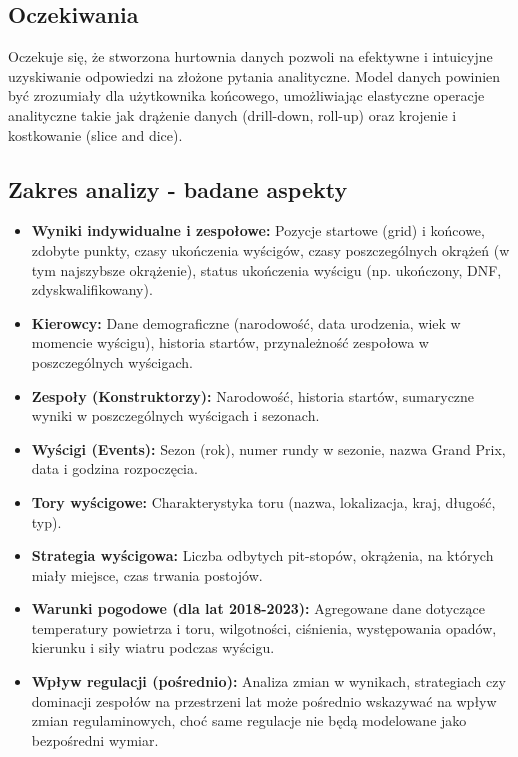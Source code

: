 \documentclass[a4paper,12pt]{article}
\begin{document}
\subsection{Oczekiwania}
Oczekuje się, że stworzona hurtownia danych pozwoli na efektywne i intuicyjne uzyskiwanie odpowiedzi na złożone pytania analityczne. Model danych powinien być zrozumiały dla użytkownika końcowego, umożliwiając elastyczne operacje analityczne takie jak drążenie danych (drill-down, roll-up) oraz krojenie i kostkowanie (slice and dice).

\subsection{Zakres analizy - badane aspekty}
\begin{itemize}[label=\textbullet, leftmargin=*]
  \item \textbf{Wyniki indywidualne i zespołowe:} Pozycje startowe (grid) i końcowe, zdobyte punkty, czasy ukończenia wyścigów, czasy poszczególnych okrążeń (w tym najszybsze okrążenie), status ukończenia wyścigu (np. ukończony, DNF, zdyskwalifikowany).
  \item \textbf{Kierowcy:} Dane demograficzne (narodowość, data urodzenia, wiek w momencie wyścigu), historia startów, przynależność zespołowa w poszczególnych wyścigach.
  \item \textbf{Zespoły (Konstruktorzy):} Narodowość, historia startów, sumaryczne wyniki w poszczególnych wyścigach i sezonach.
  \item \textbf{Wyścigi (Events):} Sezon (rok), numer rundy w sezonie, nazwa Grand Prix, data i godzina rozpoczęcia.
  \item \textbf{Tory wyścigowe:} Charakterystyka toru (nazwa, lokalizacja, kraj, długość, typ).
  \item \textbf{Strategia wyścigowa:} Liczba odbytych pit-stopów, okrążenia, na których miały miejsce, czas trwania postojów.
  \item \textbf{Warunki pogodowe (dla lat 2018-2023):} Agregowane dane dotyczące temperatury powietrza i toru, wilgotności, ciśnienia, występowania opadów, kierunku i siły wiatru podczas wyścigu.
  \item \textbf{Wpływ regulacji (pośrednio):} Analiza zmian w wynikach, strategiach czy dominacji zespołów na przestrzeni lat może pośrednio wskazywać na wpływ zmian regulaminowych, choć same regulacje nie będą modelowane jako bezpośredni wymiar.
\end{itemize}
\end{document}
